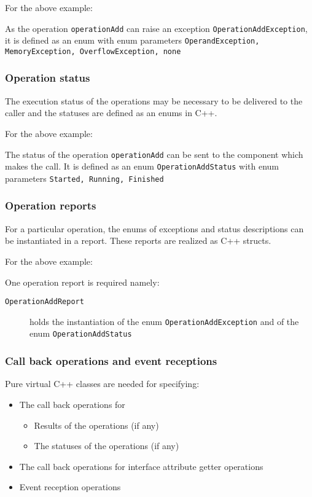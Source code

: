 For the above example:

As the operation \texttt{operationAdd} can raise an exception \texttt{OperationAddException}, it is defined as an enum with enum parameters \texttt{OperandException, MemoryException, OverflowException, none}

\subsubsection{Operation status}
The execution status of the operations may be necessary to be delivered to the caller and the statuses are defined as an enums in C++.

For the above example:

The status of the operation \texttt{operationAdd} can be sent to the component which makes the call. It is defined as an enum \texttt{OperationAddStatus} with enum parameters \texttt{Started, Running, Finished}  

\subsubsection{Operation reports}
For a particular operation, the enums of exceptions and status descriptions can be instantiated in a report. These reports are realized as C++ structs.

For the above example:

One operation report is required namely:
\begin{description}
\item [\texttt{OperationAddReport}] holds the instantiation of the enum \texttt{OperationAddException} and of the enum \texttt{OperationAddStatus} 
\end{description}     

\subsubsection{Call back operations and event receptions}
Pure virtual C++ classes are needed for specifying:
\begin{itemize}
\item The call back operations for 
\begin{itemize}
\item Results of the operations (if any)
\item The statuses of the operations (if any)
\end{itemize}
\item The call back operations for interface attribute getter operations
\item Event reception operations
\end{itemize}

